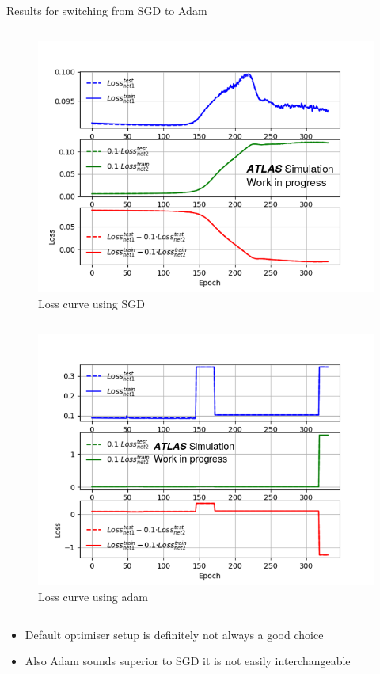 \documentclass[12pt]{beamer}
\begin{document}
\begin{frame}{Results for switching from SGD to Adam}
\vspace{-1cm}
    \begin{column}{0.5\textwidth}
    \begin{figure}
        \centering
        \includegraphics[width=1.1\textwidth]{losses_sgd.png}
        \caption{Loss curve using SGD}
        \label{fig:my_label}
    \end{figure}
\end{column}
\begin{column}{0.5\textwidth}
    \begin{figure}
        \centering
        \includegraphics[width=1.1\textwidth]{losses_adam.png}
        \caption{Loss curve using adam}
        \label{fig:my_label}
    \end{figure}
\end{column}
\begin{itemize}
    \item Default optimiser setup is definitely not always a good choice
    \item Also Adam sounds superior to SGD it is not easily interchangeable
\end{itemize}
\end{frame}
\end{document}
